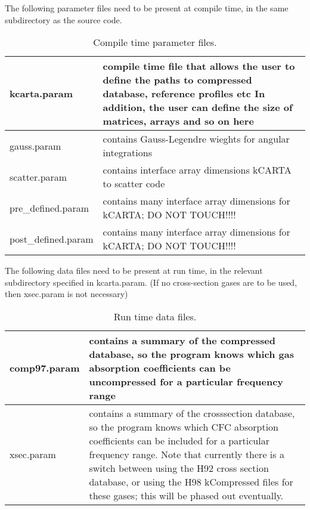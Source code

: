 \documentclass[12pt]{article}
\newlength{\colwidth}
\begin{document}
The following parameter files need to be present at compile time,
in the same subdirectory as the source code.

\begin{small}
\begin{longtable}{|l|p{\colwidth}|}
\caption{Compile time parameter files.}\\
\hline
kcarta.param        & compile time file that allows the user to define the
                      paths to compressed database, reference profiles etc
                      In addition, the user can define the size of matrices,
                      arrays and so on here\\ \hline
gauss.param         & contains Gauss-Legendre wieghts for angular 
                      integrations\\ \hline
scatter.param       & contains interface array dimensions kCARTA to scatter 
                      code\\ 
pre\_defined.param  & contains many interface array dimensions for kCARTA; 
                      DO NOT TOUCH!!!!\\ 
post\_defined.param & contains many interface array dimensions for kCARTA; 
                      DO NOT TOUCH!!!!\\ 
\hline
\end{longtable}
\end{small}

\noindent The following data files need to be present at run time, in the
relevant subdirectory specified in {\sf kcarta.param}.  (If no cross-section 
gases are to be used, then {\sf xsec.param} is not necessary)\\
\begin{small}
\begin{longtable}{|l|p{\colwidth}|}
\caption{Run time data files.}\\
\hline
comp97.param  & contains a summary of the compressed database, so the
                program knows which gas absorption coefficients can be
                uncompressed for a particular frequency range\\ \hline
xsec.param    & contains a summary of the crosssection database, so the
                program knows which {\sf CFC} absorption coefficients can be
                included for a particular frequency range.
                Note that currently there is a switch between using the H92
                cross section database, or using the H98 kCompressed files for
                these gases; this will be phased out eventually.\\
                \hline
\end{longtable}
\end{small}
\end{document}
